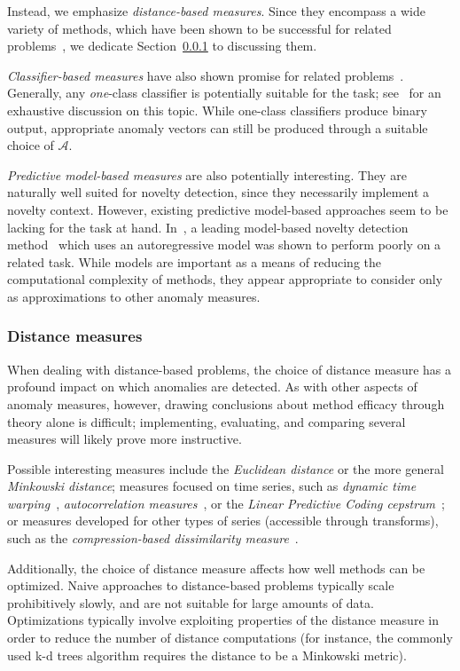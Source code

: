 Instead, we emphasize \emph{distance-based measures}. Since they encompass a wide variety of methods, which have been shown to be successful for related problems~\cite{chandola3}, we dedicate Section~\ref{sect:distance_mezurez} to discussing them.

\emph{Classifier-based measures} have also shown promise for related problems~\cite{chandola3}. Generally, any \emph{one}-class classifier is potentially suitable for the task; see~\cite{classification} for an exhaustive discussion on this topic. While one-class classifiers produce binary output, appropriate anomaly vectors can still be produced through a suitable choice of $\mathcal{A}$.

\emph{Predictive model-based measures} are also potentially interesting. They are naturally well suited for novelty detection, since they necessarily implement a novelty context. However, existing predictive model-based approaches seem to be lacking for the task at hand. In~\cite{chandola3}, a leading model-based novelty detection method~\cite{perkins2} which uses an autoregressive model was shown to perform poorly on a related task. While models are important as a means of reducing the computational complexity of methods, they appear appropriate to consider only as approximations to other anomaly measures.

\subsubsection{Distance measures}
\label{sect:distance_mezurez}

When dealing with distance-based problems, the choice of distance measure has a profound impact on which anomalies are detected. As with other aspects of anomaly measures, however, drawing conclusions about method efficacy through theory alone is difficult; implementing, evaluating, and comparing several measures will likely prove more instructive.

Possible interesting measures include the \emph{Euclidean distance} or the more general \emph{Minkowski distance}; measures focused on time series, such as \emph{dynamic time warping}~\cite{dtw}, \emph{autocorrelation measures}~\cite{autocorrelation}, or the \emph{Linear Predictive Coding cepstrum}~\cite{cepstrum}; or measures developed for other types of series (accessible through transforms), such as the \emph{compression-based dissimilarity measure}~\cite{keogh2}.

Additionally, the choice of distance measure affects how well methods can be optimized. Naive approaches to distance-based problems typically scale prohibitively slowly, and are not suitable for large amounts of data. Optimizations typically involve exploiting properties of the distance measure in order to reduce the number of distance computations (for instance, the commonly used k-d trees algorithm requires the distance to be a Minkowski metric).

